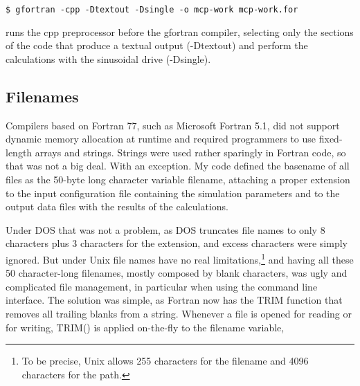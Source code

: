 \begin{lstlisting}
$ gfortran -cpp -Dtextout -Dsingle -o mcp-work mcp-work.for
\end{lstlisting}

runs the \textsf{cpp} preprocessor before the gfortran compiler, selecting only the sections of the code that produce a textual output (\textsf{-Dtextout}) and perform the calculations with the sinusoidal drive (\textsf{-Dsingle}).



\subsection{Filenames}

Compilers based on Fortran 77, such as Microsoft Fortran 5.1, did not support dynamic memory allocation at runtime and required programmers to use fixed-length arrays and strings. Strings were used rather sparingly in Fortran code, so that was not a big deal. With an exception. 
My code defined the basename of all files as the 50-byte long character variable \textsf{filename},
%
%
attaching a proper extension to the input configuration file containing the simulation parameters and to the output data files with the results of the calculations.

Under DOS that was not a problem, as DOS truncates file names to only 8 characters plus 3 characters for the extension, and excess characters were simply ignored. But under Unix file names have no real limitations,\footnote{To be precise, Unix allows 255 characters for the filename and 4096 characters for the path.} and having all these 50 character-long filenames, mostly composed by blank characters, was ugly and complicated file management, in particular when using the command line interface.
The solution was simple, as Fortran now has the \textsf{TRIM} function that removes all trailing blanks from a string. 
Whenever a file is opened for reading or for writing, \textsf{TRIM()} is applied on-the-fly to the \textsf{filename} variable,

